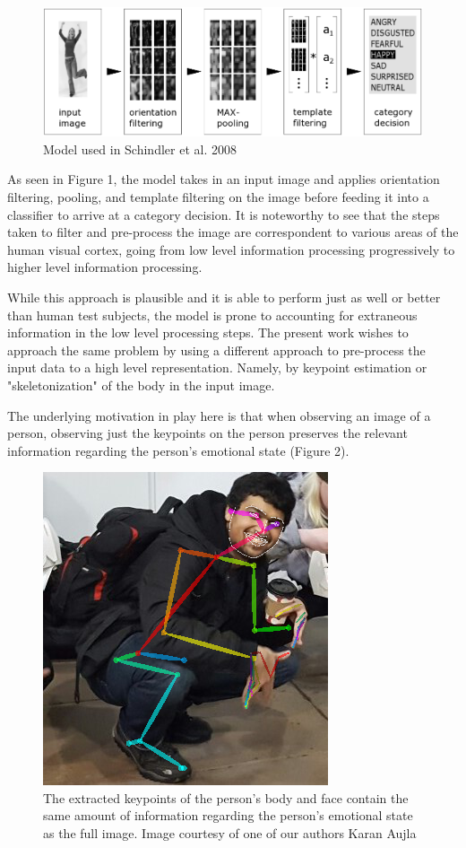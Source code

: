 \documentclass{article}
\begin{document}
\begin{figure}[h]
	\centering
	\includegraphics[scale=0.2]{schindler2008}
	\caption{Model used in Schindler et al. 2008}
\end{figure}

As seen in Figure 1, the model takes in an input image and applies orientation filtering, pooling, and template filtering on the image before feeding it into a classifier to arrive at a category decision. It is noteworthy to see that the steps taken to filter and pre-process the image are correspondent to various areas of the human visual cortex, going from low level information processing progressively to higher level information processing.

While this approach is plausible and it is able to perform just as well or better than human test subjects, the model is prone to accounting for extraneous information in the low level processing steps. The present work wishes to approach the same problem by using a different approach to pre-process the input data to a high level representation. Namely, by keypoint estimation or "skeletonization" of the body in the input image. 

The underlying motivation in play here is that when observing an image of a person, observing just the keypoints on the person preserves the relevant information regarding the person's emotional state (Figure 2).

\begin{figure}[h]
	\centering
	\includegraphics[scale=0.5]{kran}
	\caption{The extracted keypoints of the person's body and face contain the same amount of information regarding the person's emotional state as the full image. Image courtesy of one of our authors Karan Aujla}
\end{figure}
\end{document}

